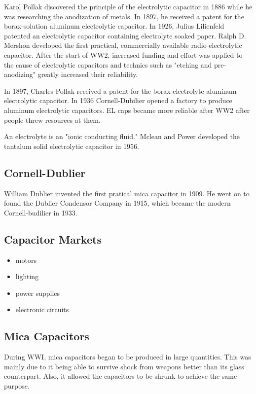 Karol Pollak discovered the principle of the electrolytic capacitor in 1886 while he was researching the anodization of metals. In 1897, he received a patent for the borax-solution aluminum electrolytic capacitor. In 1926, Julius Lilienfeld patented an electrolytic capacitor containing electrolyte soaked paper. Ralph D. Mershon developed the first practical, commercially available radio electrolytic capacitor. After the start of WW2, increased funding and effort was applied to the cause of electrolytic capacitors and technics such as "etching and pre-anodizing" greatly increased their reliability. \cite{wiki_elec}

In 1897, Charles Pollak received a patent for the borax electrolyte aluminum electrolytic capacitor. In 1936 Cornell-Dubilier opened a factory to produce aluminum electrolytic capacitors. EL caps became more reliable after WW2 after people threw resources at them. \cite{deis_hist}

An electrolyte is an "ionic conducting fluid." \cite{radio_elec}
Mclean and Power developed the tantalum solid electrolytic capacitor in 1956. \cite{radio_elec}

\subsection{Cornell-Dublier}
William Dublier invented the first pratical mica capacitor in 1909. He went on to found the Dublier Condensor Company in 1915, which became the modern Cornell-budilier in 1933.\cite{deis_hist} 

\subsection{Capacitor Markets}
\begin{itemize}
    \item motors
    \item lighting
    \item power supplies
    \item electronic circuits
\end{itemize}
\cite{capRev}

\subsection{Mica Capacitors}
During WWI, mica capacitors began to be produced in large quantities. This was mainly due to it being able to survive shock from weapons better than its glass counterpart. Also, it allowed the capacitors to be shrunk to achieve the same purpose. \cite[f.~37-41]{dumInv}

